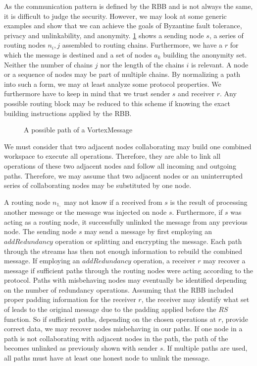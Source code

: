 As the communication pattern is defined by the RBB and is not always the same, it is difficult to judge the security. However, we may look at some generic examples and show that we can achieve the goals of Byzantine fault tolerance, privacy and unlinkability, and anonymity. \cref{fig:messagePaths} shows a sending node $s$, a series of routing nodes $n_i,j$ assembled to routing chains. Furthermore, we have a $r$ for which the message is destined and a set of nodes $a_k$ building the anonymity set. Neither the number of chains $j$ nor the length of the chains $i$ is relevant. A node or a sequence of nodes may be part of multiple chains. By normalizing a path into such a form, we may at least analyze some protocol properties. We furthermore have to keep in mind that we trust sender $s$ and receiver $r$. Any possible routing block may be reduced to this scheme if knowing the exact building instructions applied by the RBB.

\begin{figure}[ht]
	\centering\resizebox{.95\linewidth}{!}{
		
	}
	\caption{A possible path of a VortexMessage}
	\label{fig:messagePaths}
\end{figure}

We must consider that two adjacent nodes collaborating may build one combined workspace to execute all operations. Therefore, they are able to link all operations of these two adjacent nodes and follow all incoming and outgoing paths. Therefore, we may assume that two adjacent nodes or an uninterrupted series of collaborating nodes may be substituted by one node.

A routing node $n_{1,}$ may not know if a \VortexMessage{} received from $s$ is the result of processing another message or the message was injected on node $s$. Furthermore, if $s$ was acting as a routing node, it successfully unlinked the message from any previous node. The sending node $s$ may send a message by first employing an $addRedundancy$ operation or splitting and encrypting the message. Each path through the streams has then not enough information to rebuild the combined message. If employing an $addRedundancy$ operation, a receiver $r$ may recover a message if sufficient paths through the routing nodes were acting according to the protocol. Paths with misbehaving nodes may eventually be identified depending on the number of redundancy operations. Assuming that the RBB included proper padding information for the receiver $r$, the receiver may identify what set of \VortexMessages leads to the original message due to the padding applied before the $RS$ function. So if sufficient paths, depending on the chosen operations at $r$, provide correct data, we may recover nodes misbehaving in our paths. If one node in a path is not collaborating with adjacent nodes in the path, the path of the \VortexMessage becomes unlinked as previously shown with sender $s$. If multiple paths are used, all paths must have at least one honest node to unlink the message. 

